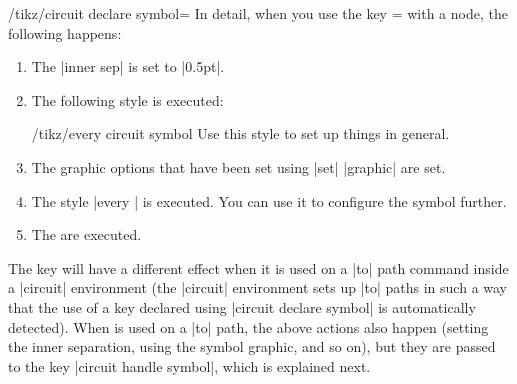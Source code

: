 \begin{key}{/tikz/circuit declare symbol=}
    In detail, when you use the key = with a node, the
    following happens:
    \begin{enumerate}
        \item The |inner sep| is set to |0.5pt|.
        \item The following style is executed:
            \begin{stylekey}{/tikz/every circuit symbol}
                Use this style to set up things in general.
            \end{stylekey}
        \item The graphic options that have been set using |set| 
            |graphic| are set.
        \item The style |every | is executed. You can use it to
            configure the symbol further.
        \item The  are executed.
  \end{enumerate}

    The key  will have a different effect when it is used on a |to|
    path command inside a |circuit| environment (the |circuit| environment sets
    up |to| paths in such a way that the use of a key declared using
    |circuit declare symbol| is automatically detected). When  is
    used on a |to| path, the above actions also happen (setting the inner
    separation, using the symbol graphic, and so on), but they are passed to
    the key |circuit handle symbol|, which is explained next.
\end{key}

